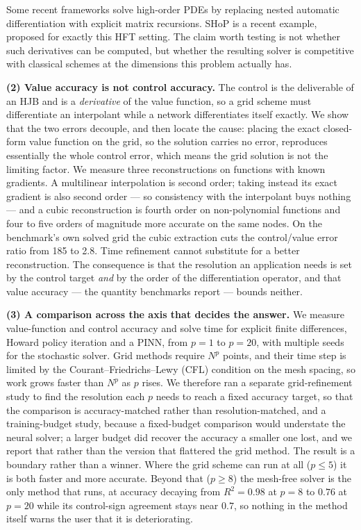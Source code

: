 \documentclass[conference]{IEEEtran}
\begin{document}
Some recent frameworks solve high-order PDEs by replacing nested automatic differentiation with
explicit matrix recursions. SHoP \cite{xiao2024shop} is a recent example, proposed for exactly
this HFT setting. The claim worth testing is not whether such derivatives can be computed, but
whether the resulting solver is competitive with classical schemes at the dimensions this problem
actually has.

\textbf{(2) Value accuracy is not control accuracy.} The
control is the deliverable of an HJB and is a \emph{derivative} of the value function, so a grid
scheme must differentiate an interpolant while a network differentiates itself exactly. We show
that the two errors decouple, and then locate the cause: placing the exact closed-form value
function on the grid, so the solution carries no error, reproduces essentially the whole control
error, which means the grid solution is not the limiting factor. We measure three reconstructions
on functions with known gradients. A multilinear interpolation is second order; taking instead its
exact gradient is also second order --- so consistency with the interpolant buys nothing --- and a
cubic reconstruction is fourth order on non-polynomial functions and four to five orders of
magnitude more accurate on the same nodes. On the benchmark's own solved grid the cubic
extraction cuts the control/value error ratio from 185 to 2.8. Time refinement cannot substitute
for a better reconstruction. The consequence is that the resolution an application needs is set by the control
target \emph{and} by the order of the differentiation operator, and that value accuracy --- the
quantity benchmarks report --- bounds neither.

\textbf{(3) A comparison across the axis that decides the answer.} We measure value-function and
control accuracy and solve time for explicit finite differences, Howard policy iteration and a PINN,
from $p=1$ to $p=20$, with multiple seeds for the stochastic solver. Grid methods require $N^p$
points, and their time step is limited by the Courant--Friedrichs--Lewy (CFL) condition on the mesh
spacing, so work grows faster than $N^p$ as $p$ rises. We therefore ran a separate grid-refinement
study to find the resolution each $p$ needs to reach a fixed accuracy target, so that the
comparison is accuracy-matched rather than resolution-matched, and a training-budget study, because
a fixed-budget comparison would understate the neural solver; a larger budget did recover the
accuracy a smaller one lost, and we report that rather than the version that flattered the grid
method. The result is a boundary rather than a winner. Where the grid scheme can run at all
($p \le 5$) it is both faster and more accurate. Beyond that ($p \ge 8$) the mesh-free solver is
the only method that runs, at accuracy decaying from $R^2 = 0.98$ at $p=8$ to $0.76$ at $p=20$
while its control-sign agreement stays near $0.7$, so nothing in the method itself warns the user
that it is deteriorating.
\end{document}

